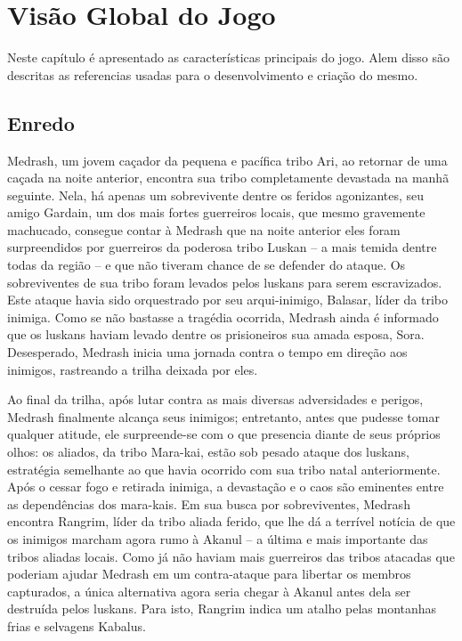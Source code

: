 \section{Visão Global do Jogo}

Neste capítulo é apresentado as características principais do jogo. 
Alem disso são descritas as referencias usadas para o desenvolvimento 
e criação do mesmo. 

\subsection{Enredo}
Medrash, um jovem caçador da pequena e pacífica tribo Ari, ao retornar de
 uma caçada na noite anterior, encontra sua tribo completamente devastada 
na manhã seguinte. Nela, há apenas um sobrevivente dentre os feridos
 agonizantes, seu amigo Gardain, um dos mais fortes guerreiros locais, que
 mesmo gravemente machucado, consegue contar à Medrash que na noite anterior
 eles foram surpreendidos por guerreiros da poderosa tribo Luskan – a mais
 temida dentre todas da região – e que não tiveram chance de se defender 
do ataque. Os sobreviventes de sua tribo foram levados pelos luskans para
 serem escravizados. Este ataque havia sido orquestrado por seu 
arqui-inimigo, Balasar, líder da tribo inimiga. Como se não bastasse a
 tragédia ocorrida, Medrash ainda é informado que os luskans haviam levado
 dentre os prisioneiros sua amada esposa, Sora.  Desesperado, Medrash 
inicia uma jornada contra o tempo em direção aos inimigos, rastreando 
a trilha deixada por eles. 

Ao final da trilha, após lutar contra as mais diversas adversidades e
 perigos, Medrash finalmente alcança seus inimigos; entretanto, antes que
 pudesse tomar qualquer atitude, ele  surpreende-se com o que presencia
 diante de seus próprios olhos: os aliados, da tribo Mara-kai, estão sob
 pesado ataque dos luskans, estratégia semelhante ao que havia ocorrido 
com sua tribo natal anteriormente. Após o cessar fogo e retirada inimiga,
 a devastação e o caos são eminentes entre as dependências dos mara-kais. 
Em sua busca por sobreviventes, Medrash encontra Rangrim, líder da tribo
 aliada ferido, que lhe dá a terrível notícia de que os inimigos marcham
 agora rumo à Akanul – a última e mais importante das tribos aliadas 
locais. Como já não haviam mais guerreiros das tribos atacadas que
 poderiam ajudar Medrash em um contra-ataque para libertar os membros
 capturados, a única alternativa agora seria chegar à Akanul antes dela 
ser destruída pelos luskans. Para isto, Rangrim indica um atalho pelas
 montanhas frias e selvagens Kabalus.
 
